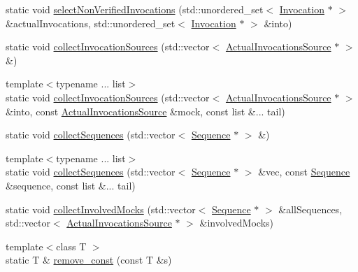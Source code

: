 \begin{DoxyCompactItemize}
\item 
static void \mbox{\hyperlink{structfakeit_1_1InvocationUtils_a333ea33ae42d98d58c0cf5cbb9a1d3cb}{select\+Non\+Verified\+Invocations}} (std\+::unordered\+\_\+set$<$ \mbox{\hyperlink{structfakeit_1_1Invocation}{Invocation}} $\ast$ $>$ \&actual\+Invocations, std\+::unordered\+\_\+set$<$ \mbox{\hyperlink{structfakeit_1_1Invocation}{Invocation}} $\ast$ $>$ \&into)
\item 
static void \mbox{\hyperlink{structfakeit_1_1InvocationUtils_abf6eefccad9f9e43592a11ed5772c2ab}{collect\+Invocation\+Sources}} (std\+::vector$<$ \mbox{\hyperlink{structfakeit_1_1ActualInvocationsSource}{Actual\+Invocations\+Source}} $\ast$ $>$ \&)
\item 
{\footnotesize template$<$typename ... list$>$ }\\static void \mbox{\hyperlink{structfakeit_1_1InvocationUtils_aa88116bb054d94ddc8a3a942f5fc3dd2}{collect\+Invocation\+Sources}} (std\+::vector$<$ \mbox{\hyperlink{structfakeit_1_1ActualInvocationsSource}{Actual\+Invocations\+Source}} $\ast$ $>$ \&into, const \mbox{\hyperlink{structfakeit_1_1ActualInvocationsSource}{Actual\+Invocations\+Source}} \&mock, const list \&... tail)
\item 
static void \mbox{\hyperlink{structfakeit_1_1InvocationUtils_ac2d11afbe797cdd0978cf42a25c4c1a6}{collect\+Sequences}} (std\+::vector$<$ \mbox{\hyperlink{classfakeit_1_1Sequence}{Sequence}} $\ast$ $>$ \&)
\item 
{\footnotesize template$<$typename ... list$>$ }\\static void \mbox{\hyperlink{structfakeit_1_1InvocationUtils_a43b674a2f1109acf4c870e8fb9c2571d}{collect\+Sequences}} (std\+::vector$<$ \mbox{\hyperlink{classfakeit_1_1Sequence}{Sequence}} $\ast$ $>$ \&vec, const \mbox{\hyperlink{classfakeit_1_1Sequence}{Sequence}} \&sequence, const list \&... tail)
\item 
static void \mbox{\hyperlink{structfakeit_1_1InvocationUtils_a8a2610f9bc4c88cb2705221970bb93d6}{collect\+Involved\+Mocks}} (std\+::vector$<$ \mbox{\hyperlink{classfakeit_1_1Sequence}{Sequence}} $\ast$ $>$ \&all\+Sequences, std\+::vector$<$ \mbox{\hyperlink{structfakeit_1_1ActualInvocationsSource}{Actual\+Invocations\+Source}} $\ast$ $>$ \&involved\+Mocks)
\item 
{\footnotesize template$<$class T $>$ }\\static T \& \mbox{\hyperlink{structfakeit_1_1InvocationUtils_ad92724e2654997a1db229644d7f2ada9}{remove\+\_\+const}} (const T \&s)
\item 

\end{DoxyCompactItemize}
